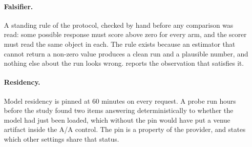 \paragraph{Falsifier.} A standing rule of the protocol, checked by hand
before any comparison was read: some possible response must score above zero
for every arm, and the scorer must read the same object in each. The rule
exists because an estimator that cannot return a non-zero value produces a
clean run and a plausible number, and nothing else about the run looks
wrong.  reports the observation that satisfies it.

\paragraph{Residency.} Model residency is pinned at 60 minutes on every
request. A probe run hours before the study found two items answering
deterministically to whether the model had just been loaded, which without the
pin would have put a venue artifact inside the A/A control. The pin is a
property of the provider, and  states which other
settings share that status.
